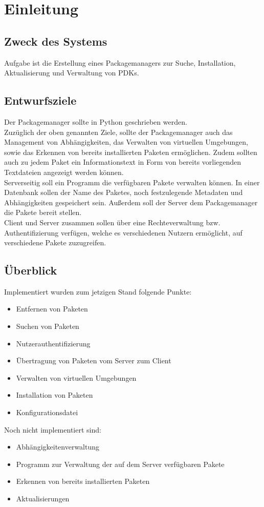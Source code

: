 \chapter{Einleitung}
\section{Zweck des Systems}
Aufgabe ist die Erstellung eines Packagemanagers zur Suche, Installation, Aktualisierung
und Verwaltung von PDKs. 

\section{Entwurfsziele}
Der Packagemanager sollte in Python geschrieben werden.\\

Zuzüglich der oben genannten Ziele, sollte der Packagemanager auch das Management von
Abhängigkeiten, das Verwalten von virtuellen Umgebungen, sowie das Erkennen von bereits
installierten Paketen ermöglichen. Zudem sollten auch zu jedem Paket ein Informationstext
in Form von bereits vorliegenden Textdateien angezeigt werden können.\\


Serverseitig soll ein Programm die verfügbaren Pakete verwalten können. In einer
Datenbank sollen der Name des Paketes, noch festzulegende Metadaten und
Abhängigkeiten gespeichert sein. Außerdem soll der Server dem
Packagemanager die Pakete bereit stellen. \\

Client und Server zusammen sollen über eine Rechteverwaltung bzw.
Authentifizierung verfügen, welche es verschiedenen Nutzern ermöglicht, auf verschiedene
Pakete zuzugreifen.

\clearpage
\section{Überblick}
Implementiert wurden zum jetzigen Stand folgende Punkte:


\begin{itemize}
    \item Entfernen von Paketen
    \item Suchen von Paketen
    \item Nutzerauthentifizierung
    \item Übertragung von Paketen vom Server zum Client
   \item Verwalten von virtuellen Umgebungen
   \item Installation von Paketen
 \item Konfigurationsdatei
\end{itemize}

Noch nicht implementiert sind:
\begin{itemize}
     \item Abhängigkeitenverwaltung
     \item Programm zur Verwaltung der auf dem Server verfügbaren Pakete
     \item Erkennen von bereits installierten Paketen
     \item Aktualisierungen 
\end{itemize}